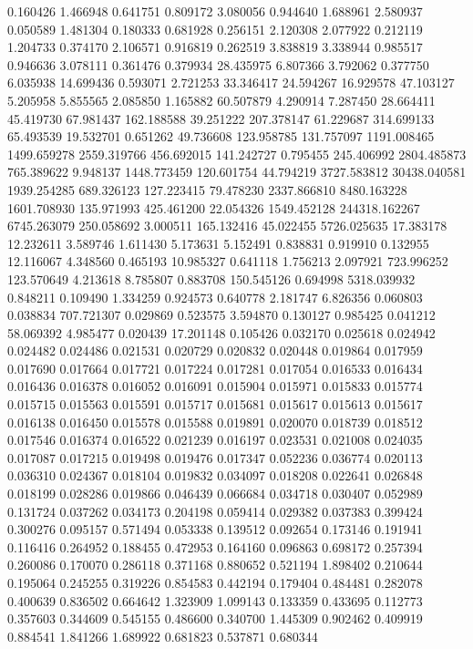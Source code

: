 0.160426
1.466948
0.641751
0.809172
3.080056
0.944640
1.688961
2.580937
0.050589
1.481304
0.180333
0.681928
0.256151
2.120308
2.077922
0.212119
1.204733
0.374170
2.106571
0.916819
0.262519
3.838819
3.338944
0.985517
0.946636
3.078111
0.361476
0.379934
28.435975
6.807366
3.792062
0.377750
6.035938
14.699436
0.593071
2.721253
33.346417
24.594267
16.929578
47.103127
5.205958
5.855565
2.085850
1.165882
60.507879
4.290914
7.287450
28.664411
45.419730
67.981437
162.188588
39.251222
207.378147
61.229687
314.699133
65.493539
19.532701
0.651262
49.736608
123.958785
131.757097
1191.008465
1499.659278
2559.319766
456.692015
141.242727
0.795455
245.406992
2804.485873
765.389622
9.948137
1448.773459
120.601754
44.794219
3727.583812
30438.040581
1939.254285
689.326123
127.223415
79.478230
2337.866810
8480.163228
1601.708930
135.971993
425.461200
22.054326
1549.452128
244318.162267
6745.263079
250.058692
3.000511
165.132416
45.022455
5726.025635
17.383178
12.232611
3.589746
1.611430
5.173631
5.152491
0.838831
0.919910
0.132955
12.116067
4.348560
0.465193
10.985327
0.641118
1.756213
2.097921
723.996252
123.570649
4.213618
8.785807
0.883708
150.545126
0.694998
5318.039932
0.848211
0.109490
1.334259
0.924573
0.640778
2.181747
6.826356
0.060803
0.038834
707.721307
0.029869
0.523575
3.594870
0.130127
0.985425
0.041212
58.069392
4.985477
0.020439
17.201148
0.105426
0.032170
0.025618
0.024942
0.024482
0.024486
0.021531
0.020729
0.020832
0.020448
0.019864
0.017959
0.017690
0.017664
0.017721
0.017224
0.017281
0.017054
0.016533
0.016434
0.016436
0.016378
0.016052
0.016091
0.015904
0.015971
0.015833
0.015774
0.015715
0.015563
0.015591
0.015717
0.015681
0.015617
0.015613
0.015617
0.016138
0.016450
0.015578
0.015588
0.019891
0.020070
0.018739
0.018512
0.017546
0.016374
0.016522
0.021239
0.016197
0.023531
0.021008
0.024035
0.017087
0.017215
0.019498
0.019476
0.017347
0.052236
0.036774
0.020113
0.036310
0.024367
0.018104
0.019832
0.034097
0.018208
0.022641
0.026848
0.018199
0.028286
0.019866
0.046439
0.066684
0.034718
0.030407
0.052989
0.131724
0.037262
0.034173
0.204198
0.059414
0.029382
0.037383
0.399424
0.300276
0.095157
0.571494
0.053338
0.139512
0.092654
0.173146
0.191941
0.116416
0.264952
0.188455
0.472953
0.164160
0.096863
0.698172
0.257394
0.260086
0.170070
0.286118
0.371168
0.880652
0.521194
1.898402
0.210644
0.195064
0.245255
0.319226
0.854583
0.442194
0.179404
0.484481
0.282078
0.400639
0.836502
0.664642
1.323909
1.099143
0.133359
0.433695
0.112773
0.357603
0.344609
0.545155
0.486600
0.340700
1.445309
0.902462
0.409919
0.884541
1.841266
1.689922
0.681823
0.537871
0.680344
